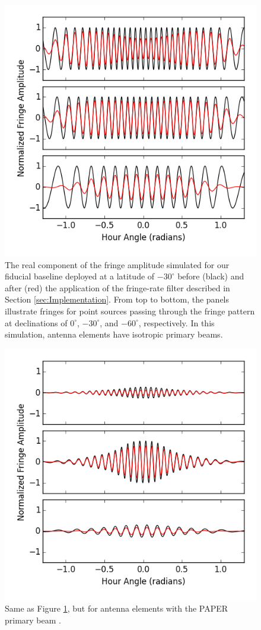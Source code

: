 \documentclass[twocolumn,apj,numberedappendix]{emulateapj}
\begin{document}
\begin{figure}\centering
\includegraphics[width=0.9\columnwidth]{plots/src_track_flat.png}
\caption{
The real component of the fringe amplitude simulated for our fiducial 
baseline deployed at a latitude of $-30^\circ$
before (black) and after (red) the application
of the fringe-rate filter described in Section \ref{sec:Implementation}.  From top to bottom,
the panels illustrate fringes
for point sources 
passing through the fringe pattern at declinations of $0^\circ$,
$-30^\circ$, and $-60^\circ$, respectively.  In this simulation,
antenna elements have isotropic primary beams.
}\label{fig:src_track_flat}
\end{figure}

\begin{figure}\centering
\includegraphics[width=0.9\columnwidth]{plots/src_track_beam.png}
\caption{
Same as Figure \ref{fig:src_track_flat}, but for antenna elements
with the PAPER primary beam \citep{parsons_et_al2010,pober_et_al2012}.
}\label{fig:src_track_beam}
\end{figure}
\end{document}
